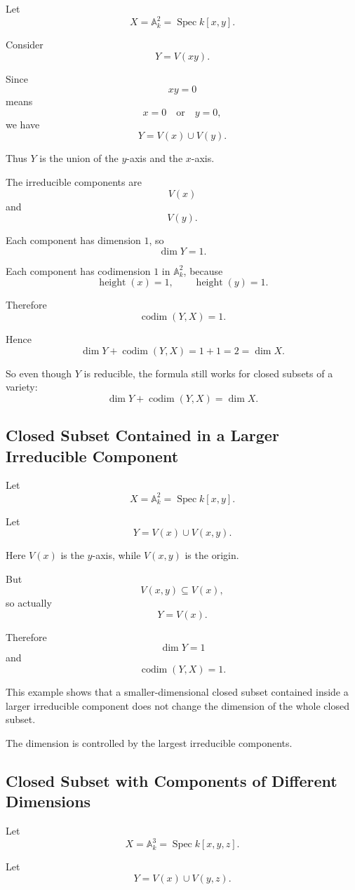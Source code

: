 \documentclass[12pt,a4paper]{article}
\theoremstyle{notespace}
\begin{document}
Let
\[
X=\mathbb A^2_k=\operatorname{Spec} k[x,y].
\]

Consider
\[
Y=V(xy).
\]

Since
\[
xy=0
\]
means
\[
x=0
\quad\text{or}\quad
y=0,
\]
we have
\[
Y=V(x)\cup V(y).
\]

Thus \(Y\) is the union of the \(y\)-axis and the \(x\)-axis.

The irreducible components are
\[
V(x)
\]
and
\[
V(y).
\]

Each component has dimension \(1\), so
\[
\dim Y=1.
\]

Each component has codimension \(1\) in \(\mathbb A^2_k\), because
\[
\operatorname{height}(x)=1,
\qquad
\operatorname{height}(y)=1.
\]

Therefore
\[
\operatorname{codim}(Y,X)=1.
\]

Hence
\[
\dim Y+\operatorname{codim}(Y,X)
=
1+1
=
2
=
\dim X.
\]

So even though \(Y\) is reducible, the formula still works for closed subsets of a variety:
\[
\boxed{\dim Y+\operatorname{codim}(Y,X)=\dim X.}
\]

\subsection{Closed Subset Contained in a Larger Irreducible Component}

Let
\[
X=\mathbb A^2_k=\operatorname{Spec} k[x,y].
\]

Let
\[
Y=V(x)\cup V(x,y).
\]

Here \(V(x)\) is the \(y\)-axis, while \(V(x,y)\) is the origin.

But
\[
V(x,y)\subseteq V(x),
\]
so actually
\[
Y=V(x).
\]

Therefore
\[
\dim Y=1
\]
and
\[
\operatorname{codim}(Y,X)=1.
\]

This example shows that a smaller-dimensional closed subset contained inside a larger irreducible component does not change the dimension of the whole closed subset.

The dimension is controlled by the largest irreducible components.

\subsection{Closed Subset with Components of Different Dimensions}

Let
\[
X=\mathbb A^3_k=\operatorname{Spec} k[x,y,z].
\]

Let
\[
Y=V(x)\cup V(y,z).
\]
\end{document}
